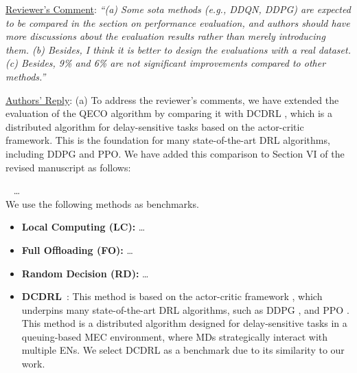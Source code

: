 \documentclass[12pt,draftclsnofoot,onecolumn]{IEEEtran}
\newcommand{\rev}[1]{{\color{blue}#1}} %
\newcommand{\rev}[1]{#1}
\newenvironment{my}[2]%
{\begin{list}{}%
{\setlength{\rightmargin}{#1}\setlength{\leftmargin}{#2}}%


 \item[]{}

} {\end{list}}
\begin{document}
\begin{enumerate}
\item \underline{Reviewer's Comment}: 
\textit{``(a) Some sota methods (e.g., DDQN, DDPG) are expected to be compared in the section on performance evaluation, and authors should have more discussions about the evaluation results rather than merely introducing them.  (b) Besides, I think it is better to design the evaluations with a real dataset. (c) Besides, 9\% and 6\% are not significant improvements compared to other methods.''}\newline


\underline{Authors' Reply}: (a) To address the reviewer's comments, we have extended the evaluation of the QECO algorithm by comparing it with DCDRL \cite{qiu2020distributed}, which is a distributed algorithm for delay-sensitive tasks based on the actor-critic framework. This is the foundation for many state-of-the-art DRL algorithms, including DDPG and PPO. 
We have added this comparison to Section VI of the revised manuscript as follows: \newline 


		\begin{my}{1cm}{1cm}
	\rev{
		{\
			\color{black}
\hspace{-10mm}  \dots \\ We use the following methods as benchmarks.
\begin{itemize}
	
	\item \textbf{Local Computing (LC):} \dots\vspace{1mm}
	
	\item \textbf{Full Offloading (FO):} \dots\vspace{1mm}
	
	\item \textbf{Random Decision (RD):} \dots\vspace{1mm}
	
	\color{blue}
	\item \textbf{DCDRL}~\cite{qiu2020distributed}: This method is based on the actor-critic framework \cite{NIPS1999_6449f44a}, which underpins many state-of-the-art DRL algorithms, such as DDPG \cite{lillicrap2015continuous}, and PPO \cite{schulman2017proximal}. This method is a distributed algorithm designed for delay-sensitive tasks in a queuing-based MEC environment, where MDs strategically interact with multiple ENs. We select DCDRL as a benchmark due to its similarity to our work. 
	
	
	

\end{itemize}}}
\end{my}
\end{enumerate}
\end{document}
